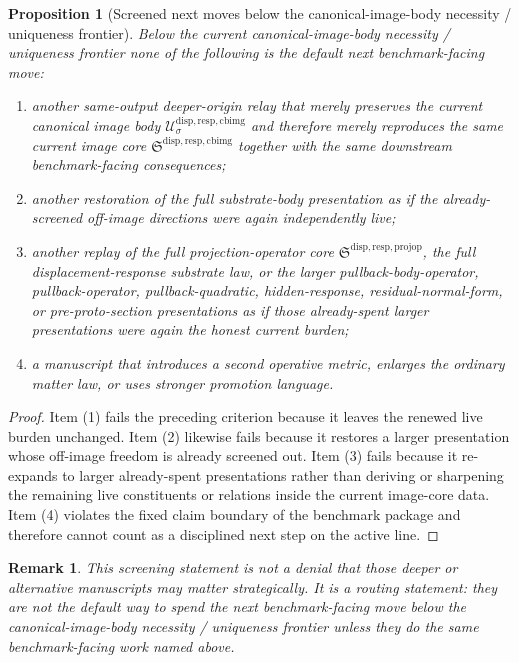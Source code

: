 \documentclass[11pt]{article}
\newcommand{\ProjectionOperatorCore}{\mathfrak S^{\mathrm{disp,resp,projop}}}
\newcommand{\CurrentBodyImageCore}{\mathfrak S^{\mathrm{disp,resp,cbimg}}}
\newcommand{\CanonicalImageBody}[1]{\mathcal U_{#1}^{\mathrm{disp,resp,cbimg}}}
\newtheorem{proposition}{Proposition}
\newtheorem{remark}{Remark}
\begin{document}
\begin{proposition}[Screened next moves below the canonical-image-body necessity / uniqueness frontier]
Below the current canonical-image-body necessity / uniqueness frontier none of the following is the default next benchmark-facing move:
\begin{enumerate}
    \item another same-output deeper-origin relay that merely preserves the current canonical image body \(\CanonicalImageBody{\sigma}\) and therefore merely reproduces the same current image core \(\CurrentBodyImageCore\) together with the same downstream benchmark-facing consequences;
    \item another restoration of the full substrate-body presentation as if the already-screened off-image directions were again independently live;
    \item another replay of the full projection-operator core \(\ProjectionOperatorCore\), the full displacement-response substrate law, or the larger pullback-body-operator, pullback-operator, pullback-quadratic, hidden-response, residual-normal-form, or pre-proto-section presentations as if those already-spent larger presentations were again the honest current burden;
    \item a manuscript that introduces a second operative metric, enlarges the ordinary matter law, or uses stronger promotion language.
\end{enumerate}
\end{proposition}

\begin{proof}
Item (1) fails the preceding criterion because it leaves the renewed live burden unchanged. Item (2) likewise fails because it restores a larger presentation whose off-image freedom is already screened out. Item (3) fails because it re-expands to larger already-spent presentations rather than deriving or sharpening the remaining live constituents or relations inside the current image-core data. Item (4) violates the fixed claim boundary of the benchmark package and therefore cannot count as a disciplined next step on the active line.
\end{proof}

\begin{remark}
This screening statement is not a denial that those deeper or alternative manuscripts may matter strategically. It is a routing statement: they are not the default way to spend the next benchmark-facing move below the canonical-image-body necessity / uniqueness frontier unless they do the same benchmark-facing work named above.
\end{remark}
\end{document}
